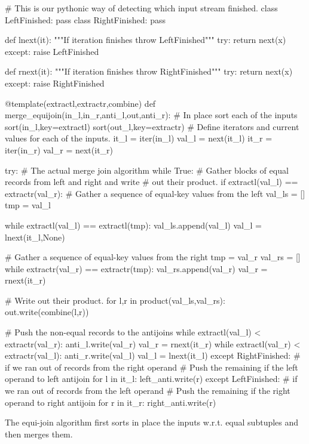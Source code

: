 \begin{code}
\begin{pycode}
# This is our pythonic way of detecting which input stream finished.
class LeftFinished:
    pass
class RightFinished:
    pass


def lnext(it):
    """If iteration finishes throw LeftFinished"""
    try:
        return next(x)
    except:
        raise LeftFinished

def rnext(it):
    """If iteration finishes throw RightFinished"""
    try:
        return next(x)
    except:
        raise RightFinished

@template(extractl,extractr,combine)
def merge_equijoin(in_l,in_r,anti_l,out,anti_r):
    # In place sort each of the inputs
    sort(in_l,key=extractl)
    sort(out_l,key=extractr)
    # Define iterators and current values for each of the inputs.
    it_l = iter(in_l)
    val_l = next(it_l)
    it_r = iter(in_r)
    val_r = next(it_r)

    try:
        # The actual merge join algorithm
        while True:
            # Gather blocks of equal records from left and right and write
            # out their product.
            if extractl(val_l) == extractr(val_r):
                # Gather a sequence of equal-key values from the left
                val_ls = []
                tmp = val_l

                while extractl(val_l) == extractl(tmp):
                    val_ls.append(val_l)
                    val_l = lnext(it_l,None)

                # Gather a sequence of equal-key values from the right
                tmp = val_r
                val_rs = []
                while extractr(val_r) == extractr(tmp):
                    val_rs.append(val_r)
                    val_r = rnext(it_r)

                # Write out their product.
                for l,r in product(val_ls,val_rs):
                    out.write(combine(l,r))

            # Push the non-equal records to the antijoins
            while extractl(val_l) < extractr(val_r):
                anti_l.write(val_r)
                val_r = rnext(it_r)
            while extractl(val_r) < extractr(val_l):
                anti_r.write(val_l)
                val_l = lnext(it_l)
    except RightFinished:
        # if we ran out of records from the right operand
        # Push the remaining if the left operand to left antijoin
        for l in it_l:
            left_anti.write(r)
    except LeftFinished:
        # if we ran out of records from the left operand
        # Push the remaining if the right operand to right antijoin
        for r in it_r:
            right_anti.write(r)
\end{pycode}
\caption{\label{lst:join_algorithm}The equi-join algorithm first sorts
  in place the inputs w.r.t. equal subtuples and then merges
  them.}
\end{code}



